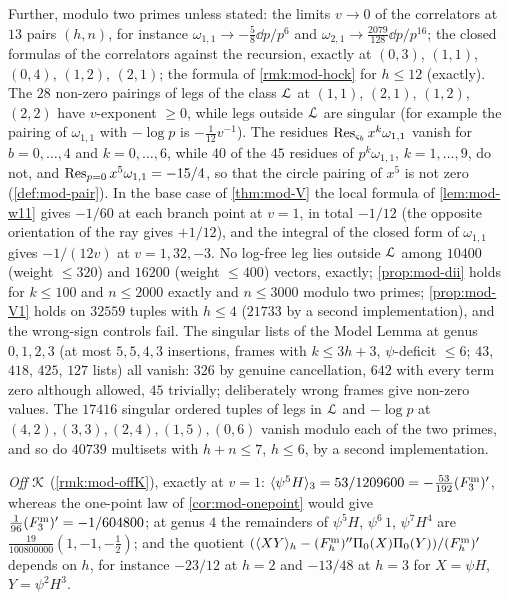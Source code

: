 Further, modulo two primes unless stated: the limits $v\to 0$ of the correlators at $13$ pairs $(h,n)$, for instance $\omega_{1,1}\to-\tfrac58\dd p/p^6$ and $\omega_{2,1}\to\tfrac{2079}{128}\dd p/p^{16}$; the closed formulas of the correlators against the recursion, exactly at $(0,3)$, $(1,1)$, $(0,4)$, $(1,2)$, $(2,1)$; the formula of \cref{rmk:mod-hock} for $h\leq 12$ (exactly). The $28$ non-zero pairings of legs of the class $\mathcal{L}$ at $(1,1)$, $(2,1)$, $(1,2)$, $(2,2)$ have $v$-exponent $\geq 0$, while legs outside $\mathcal{L}$ are singular (for example the pairing of $\omega_{1,1}$ with $-\log p$ is $-\tfrac1{12}v^{-1}$). The residues $\operatorname*{Res}_{\varsigma_b}x^k\omega_{1,1}$ vanish for $b=0,\dots,4$ and $k=0,\dots,6$, while $40$ of the $45$ residues of $p^k\omega_{1,1}$, $k=1,\dots,9$, do not, and $\operatorname*{Res}_{p=0}x^5\omega_{1,1}=-15/4$, so that the circle pairing of $x^5$ is not zero (\cref{def:mod-pair}). In the base case of \cref{thm:mod-V} the local formula of \cref{lem:mod-w11} gives $-1/60$ at each branch point at $v=1$, in total $-1/12$ (the opposite orientation of the ray gives $+1/12$), and the integral of the closed form of $\omega_{1,1}$ gives $-1/(12v)$ at $v=1,32,-3$. No log-free leg lies outside $\mathcal{L}$ among $10400$ (weight $\leq 320$) and $16200$ (weight $\leq 400$) vectors, exactly; \cref{prop:mod-dii} holds for $k\leq 100$ and $n\leq 2000$ exactly and $n\leq 3000$ modulo two primes; \cref{prop:mod-V1} holds on $32559$ tuples with $h\leq 4$ ($21733$ by a second implementation), and the wrong-sign controls fail. The singular lists of the Model Lemma at genus $0,1,2,3$ (at most $5,5,4,3$ insertions, frames with $k\leq 3h+3$, $\psi$-deficit $\leq 6$; $43$, $418$, $425$, $127$ lists) all vanish: $326$ by genuine cancellation, $642$ with every term zero although allowed, $45$ trivially; deliberately wrong frames give non-zero values. The $17416$ singular ordered tuples of legs in $\mathcal{L}$ and $-\log p$ at $(4,2),(3,3),(2,4),(1,5),(0,6)$ vanish modulo each of the two primes, and so do $40739$ multisets with $h+n\leq 7$, $h\leq 6$, by a second implementation.

\emph{Off $\mathcal{K}$} (\cref{rmk:mod-offK}), exactly at $v=1$: $\langle\psi^5H\rangle_3=53/1209600=-\tfrac{53}{192}(F^{\mathrm{m}}_3)'$, whereas the one-point law of \cref{cor:mod-onepoint} would give $\tfrac1{96}(F^{\mathrm{m}}_3)'=-1/604800$; at genus $4$ the remainders of $\psi^5H$, $\psi^6\,1$, $\psi^7H^4$ are $\tfrac{19}{100800000}(1,-1,-\tfrac12)$; and the quotient $(\langle XY\rangle_h-(F^{\mathrm{m}}_h)''\Pi_0(X)\Pi_0(Y))/(F^{\mathrm{m}}_h)'$ depends on $h$, for instance $-23/12$ at $h=2$ and $-13/48$ at $h=3$ for $X=\psi H$, $Y=\psi^2H^3$.

